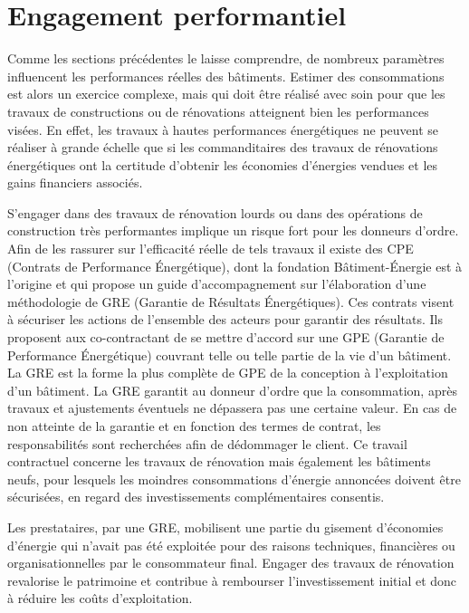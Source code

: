 \section{Engagement performantiel}

Comme les sections précédentes le laisse comprendre, de nombreux paramètres influencent les performances réelles des bâtiments. Estimer des consommations est alors un exercice complexe, mais qui doit être réalisé avec soin pour que les travaux de constructions ou de rénovations atteignent bien les performances visées. En effet, les travaux à hautes performances énergétiques ne peuvent se réaliser à grande échelle que si les commanditaires des travaux de rénovations énergétiques ont la certitude d'obtenir les économies d'énergies vendues et les gains financiers associés.

S'engager dans des travaux de rénovation lourds ou dans des opérations de construction très performantes implique un risque fort pour les donneurs d'ordre. Afin de les rassurer sur l'efficacité réelle de tels travaux il existe des CPE (Contrats de Performance Énergétique), dont la fondation Bâtiment-Énergie \cite{FBE-16} est à l'origine et qui propose un guide d'accompagnement sur l'élaboration d'une méthodologie de GRE (Garantie de Résultats Énergétiques). Ces contrats visent à sécuriser les actions de l'ensemble des acteurs pour garantir des résultats. Ils proposent aux co-contractant de se mettre d'accord sur une GPE (Garantie de Performance Énergétique) couvrant telle ou telle partie de la vie d'un bâtiment. La GRE est la forme la plus complète de GPE de la conception à l'exploitation d'un bâtiment. La GRE garantit au donneur d'ordre que la consommation, après travaux et ajustements éventuels ne dépassera pas une certaine valeur. En cas de non atteinte de la garantie et en fonction des termes de contrat, les responsabilités sont recherchées afin de dédommager le client. Ce travail contractuel concerne les travaux de rénovation mais également les bâtiments neufs, pour lesquels les moindres consommations d'énergie annoncées doivent être sécurisées, en regard des investissements complémentaires consentis.

Les prestataires, par une GRE, mobilisent une partie du gisement d'économies d'énergie qui n'avait pas été exploitée pour des raisons techniques, financières ou organisationnelles par le consommateur final. Engager des travaux de rénovation revalorise le patrimoine et contribue à rembourser l'investissement initial et donc à réduire les coûts d'exploitation.

